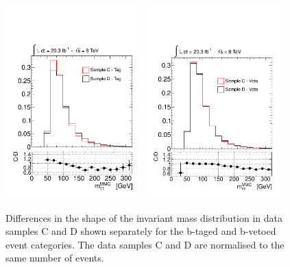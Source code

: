 \begin{figure}[h]
	\begin{center}
	\includegraphics[width=0.47\textwidth]{figure/systematics/qcd_shape_tag.pdf}
	\includegraphics[width=0.47\textwidth]{figure/systematics/qcd_shape_veto.pdf}
	\end{center}
	\caption{Differences in the shape of the invariant \mmc mass distribution in data samples  C and D shown 
	separately for the b-taged  and b-vetoed event categories. The data samples C and D are normalised to the same 
	number of events.}
	\label{fig:qcd_shape_unc}
\end{figure}






